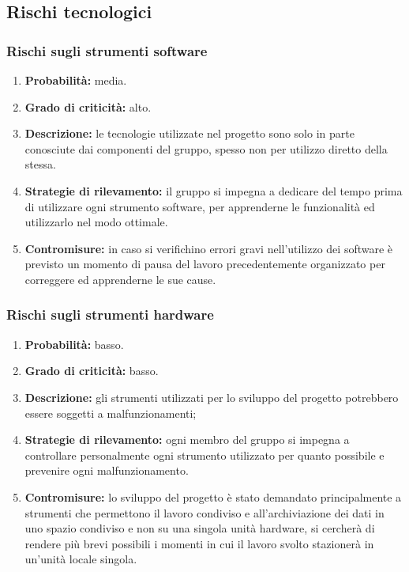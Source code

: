 \subsection{Rischi tecnologici}
\subsubsection{Rischi sugli strumenti software}
\begin{enumerate}
	\item \textbf{Probabilità:} media.
	\item \textbf{Grado di criticità:} alto.
	\item \textbf{Descrizione:} le tecnologie utilizzate nel progetto sono solo in parte conosciute dai componenti del gruppo, spesso non per utilizzo diretto della stessa.
	\item \textbf{Strategie di rilevamento:} il gruppo si impegna a dedicare del tempo prima di utilizzare ogni strumento software, per apprenderne le funzionalità ed utilizzarlo nel modo ottimale.
	\item \textbf{Contromisure:} in caso si verifichino errori gravi nell'utilizzo dei software è previsto un momento di pausa del lavoro precedentemente organizzato per correggere ed apprenderne le sue cause.
\end{enumerate}

\subsubsection{Rischi sugli strumenti hardware}
\begin{enumerate}
	\item \textbf{Probabilità:} basso.
	\item \textbf{Grado di criticità:} basso.
	\item \textbf{Descrizione:} gli strumenti utilizzati per lo sviluppo del progetto potrebbero essere soggetti a malfunzionamenti;
	\item \textbf{Strategie di rilevamento:} ogni membro del gruppo si impegna a controllare personalmente ogni strumento utilizzato per quanto possibile e prevenire ogni malfunzionamento.
	\item \textbf{Contromisure:} lo sviluppo del progetto è stato demandato principalmente a strumenti che permettono il lavoro condiviso e all’archiviazione dei dati in uno spazio condiviso e non su una singola unità hardware, si cercherà di rendere più brevi possibili i momenti in cui il lavoro svolto stazionerà in un’unità locale singola.
\end{enumerate}

